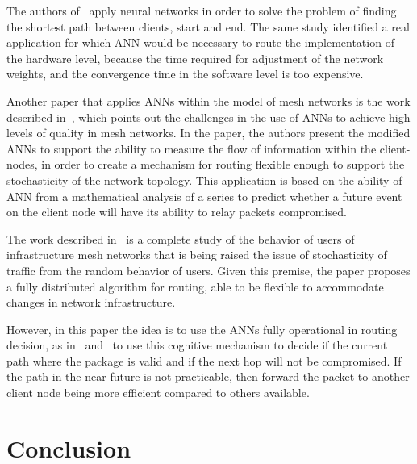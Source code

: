 \documentclass[10pt, conference, compsocconf]{IEEEtran}
\begin{document}

The authors of~\cite{Venkataram:2002:NNB:638963.638974} apply neural networks in order to solve the problem of finding the shortest path between clients, start and end. The same study identified a real application for which ANN would be necessary to route the implementation of the hardware level, because the time required for adjustment of the network weights, and the convergence time in the software level is too expensive.

Another paper that applies ANNs within the model of mesh networks is the work described in~\cite{Zhi:5364647}, which points out the challenges in the use of ANNs to achieve high levels of quality in mesh networks. In the paper, the authors present the modified ANNs to support the ability to measure the flow of information within the client-nodes, in order to create a mechanism for routing flexible enough to support the stochasticity of the network topology. This application is based on the ability of ANN from a mathematical analysis of a series to predict whether a future event on the client node will have its ability to relay packets compromised.

The work described in~\cite{Song:5072224} is a complete study of the behavior of users of infrastructure mesh networks that is being raised the issue of stochasticity of traffic from the random behavior of users. Given this premise, the paper proposes a fully distributed algorithm for routing, able to be flexible to accommodate changes in network infrastructure.

However, in this paper the idea is to use the ANNs fully operational in routing decision, as in~\cite{Zhi:5364647} and~\cite{Venkataram:2002:NNB:638963.638974} to use this cognitive mechanism to decide if the current path where the package is valid and if the next hop will not be compromised. If the path in the near future is not practicable, then forward the packet to another client node being more efficient compared to others available.

\section{Conclusion}\label{sec:con}
\end{document}
